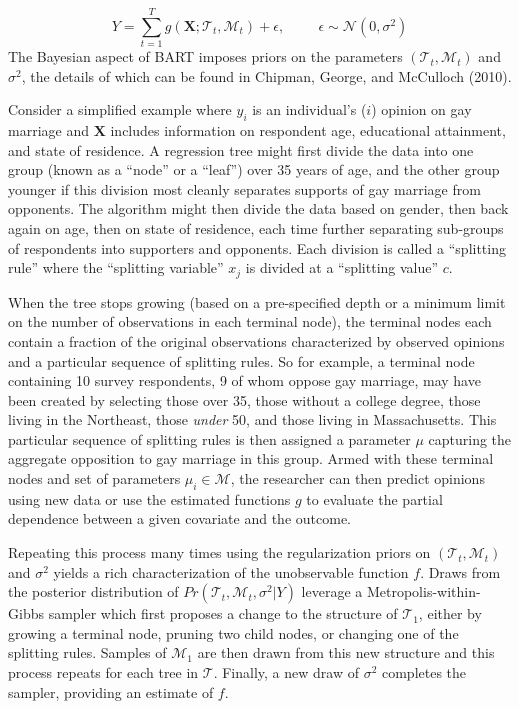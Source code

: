 \documentclass[]{article}
\begin{document}
\[ Y = \sum_{t=1}^T g(\mathbf{X}; \mathcal{T}_t,\mathcal{M}_t) + \epsilon, \hspace{1cm} \epsilon \sim \mathcal{N}(0,\sigma^2)\]
The Bayesian aspect of BART imposes priors on the parameters
\((\mathcal{T}_t,\mathcal{M}_t)\) and \(\sigma^2\), the details of which
can be found in Chipman, George, and McCulloch (2010).

Consider a simplified example where \(y_i\) is an individual's (\(i\))
opinion on gay marriage and \(\mathbf{X}\) includes information on
respondent age, educational attainment, and state of residence. A
regression tree might first divide the data into one group (known as a
``node'' or a ``leaf'') over 35 years of age, and the other group
younger if this division most cleanly separates supports of gay marriage
from opponents. The algorithm might then divide the data based on
gender, then back again on age, then on state of residence, each time
further separating sub-groups of respondents into supporters and
opponents. Each division is called a ``splitting rule'' where the
``splitting variable'' \(x_j\) is divided at a ``splitting value''
\(c\).

When the tree stops growing (based on a pre-specified depth or a minimum
limit on the number of observations in each terminal node), the terminal
nodes each contain a fraction of the original observations characterized
by observed opinions and a particular sequence of splitting rules. So
for example, a terminal node containing 10 survey respondents, 9 of whom
oppose gay marriage, may have been created by selecting those over 35,
those without a college degree, those living in the Northeast, those
\emph{under} 50, and those living in Massachusetts. This particular
sequence of splitting rules is then assigned a parameter \(\mu\)
capturing the aggregate opposition to gay marriage in this group. Armed
with these terminal nodes and set of parameters
\(\mu_i \in \mathcal{M}\), the researcher can then predict opinions
using new data or use the estimated functions \(g\) to evaluate the
partial dependence between a given covariate and the outcome.

Repeating this process many times using the regularization priors on
\((\mathcal{T}_t,\mathcal{M}_t)\) and \(\sigma^2\) yields a rich
characterization of the unobservable function \(f\). Draws from the
posterior distribution of \(Pr(\mathcal{T}_t,\mathcal{M}_t,\sigma^2|Y)\)
leverage a Metropolis-within-Gibbs sampler which first proposes a change
to the structure of \(\mathcal{T_1}\), either by growing a terminal
node, pruning two child nodes, or changing one of the splitting rules.
Samples of \(\mathcal{M}_1\) are then drawn from this new structure and
this process repeats for each tree in \(\mathcal{T}\). Finally, a new
draw of \(\sigma^2\) completes the sampler, providing an estimate of
\(f\).
\end{document}
